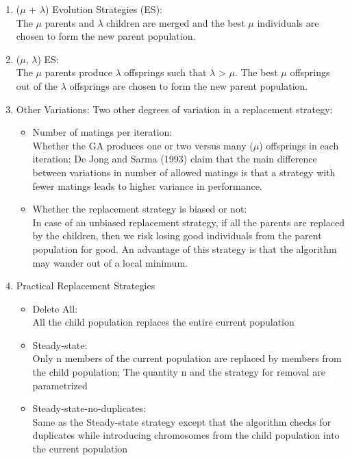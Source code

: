 \documentclass[12pt,a4paper]{article}
\begin{document}
	\begin{enumerate}
	\item ($\mu$ + $\lambda$) Evolution Strategies (ES): \\
	The $\mu$ parents and $\lambda$ children are merged and the best $\mu$ individuals are chosen to form the new parent population.
	
	\item ($\mu$, $\lambda$) ES: \\
	The $\mu$ parents produce $\lambda$ offsprings such that $\lambda$ > $\mu$. The best $\mu$ offsprings out of the $\lambda$ offsprings are chosen to form the new parent population.
	
	\item Other Variations:
	Two other degrees of variation in a replacement strategy:
	
		\begin{itemize}
		\item Number of matings per iteration: \\
		Whether the GA produces one or two versus many ($\mu$) offsprings in each iteration; De Jong and Sarma (1993) claim that the main difference between variations in number of allowed matings is that a strategy with fewer matings leads to higher variance in performance.
		\item Whether the replacement strategy is biased or not: \\
		In case of an unbiased replacement strategy, if all the parents are replaced by the children, then we risk losing good individuals from the parent population for good. An advantage of this strategy is that the algorithm may wander out of a local minimum.
		\end{itemize}
	
	\item Practical Replacement Strategies \cite{goldberg}
		\begin{itemize}
		\item Delete All: \\
		All the child population replaces the entire current population
		\item Steady-state: \\
		Only n members of the current population are replaced by members from the child population; The quantity n and the strategy for removal are parametrized
		\item Steady-state-no-duplicates: \\
		Same as the Steady-state strategy except that the algorithm checks for duplicates while introducing chromosomes from the child population into the current population
		\end{itemize}
	\end{enumerate}
\end{document}
